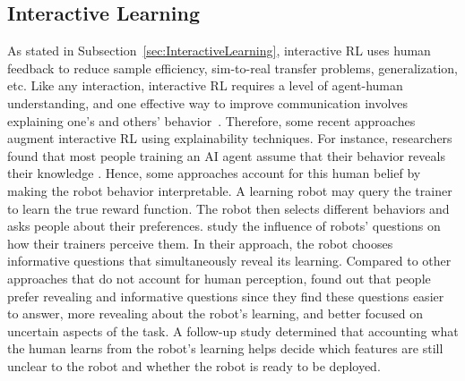 \documentclass[twoside,11pt]{article}
\begin{document}
\subsection{Interactive Learning}
As stated in Subsection~\ref{sec:InteractiveLearning}, interactive RL uses human feedback to reduce sample efficiency, sim-to-real transfer problems, generalization, etc. Like any interaction, interactive RL requires a level of agent-human understanding, and one effective way to improve communication involves explaining one's and others' behavior~\citep{de:17}. Therefore, some recent approaches augment interactive RL using explainability techniques. For instance, researchers found that most people training an AI agent assume that their behavior reveals their knowledge \citep{habibian:21}. Hence, some approaches account for this human belief by making the robot behavior interpretable. A learning robot may query the trainer to learn the true reward function. The robot then selects different behaviors and asks people about their preferences. \citet{habibian:21} study the influence of robots' questions on how their trainers perceive them. In their approach, the robot chooses informative questions that simultaneously reveal its learning. Compared to other approaches that do not account for human perception, \citet{habibian:21} found out that people prefer revealing and informative questions since they find these questions easier to answer, more revealing about the robot's learning, and better focused on uncertain aspects of the task. A follow-up study determined that accounting what the human learns from the robot's learning helps decide which features are still unclear to the robot and whether the robot is ready to be deployed. 
\end{document}
